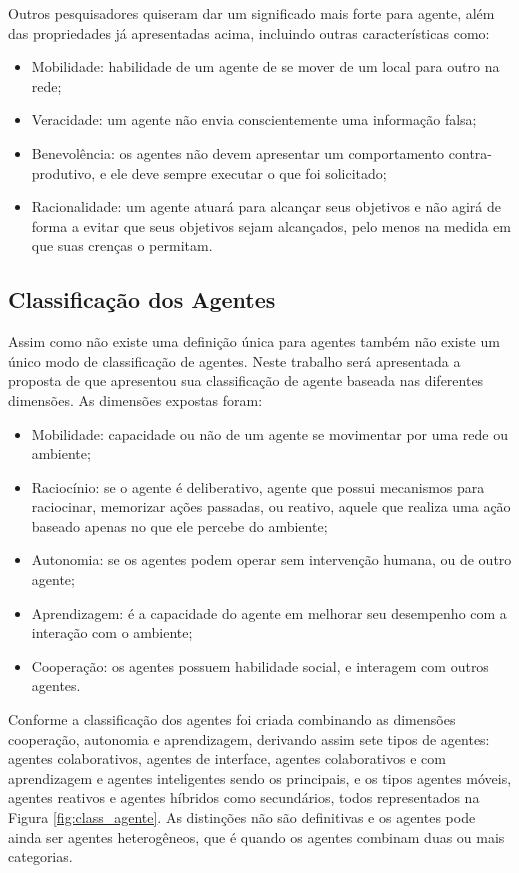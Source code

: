 Outros pesquisadores quiseram dar um significado mais forte para agente, além das propriedades já apresentadas acima, incluindo outras características como:

\begin{itemize}
\item Mobilidade: habilidade de um agente de se mover de um local para outro na rede;
\item Veracidade: um agente não envia conscientemente uma informação falsa;
\item Benevolência: os agentes não devem apresentar um comportamento contra-produtivo, e ele deve sempre executar o que foi solicitado;
\item Racionalidade: um agente atuará para alcançar seus objetivos e não agirá de forma a evitar que seus objetivos sejam alcançados, pelo menos na medida em que suas crenças o permitam.
\end{itemize}

\subsection{Classificação dos Agentes}

Assim como não existe uma definição única para agentes também não existe um único modo de classificação de agentes. Neste trabalho será apresentada a proposta de \citet{nwana1996software} que apresentou sua classificação de agente baseada nas diferentes dimensões. As dimensões expostas foram:

\begin{itemize}
\item Mobilidade: capacidade ou não de um agente se movimentar por uma rede ou ambiente;
\item Raciocínio: se o agente é deliberativo, agente que possui mecanismos para raciocinar, memorizar ações passadas, ou reativo, aquele que realiza uma ação baseado apenas no que ele percebe do ambiente;
\item Autonomia: se os agentes podem operar sem intervenção humana, ou de outro agente;
\item Aprendizagem: é a capacidade do agente em melhorar seu desempenho com a interação com o ambiente;
\item Cooperação: os agentes possuem habilidade social, e interagem com outros agentes.
\end{itemize}

 Conforme \cite{nwana1996software} a classificação dos agentes foi criada  combinando as dimensões cooperação, autonomia e aprendizagem, derivando assim sete tipos de agentes: agentes colaborativos, agentes de interface, agentes colaborativos e com aprendizagem e agentes inteligentes sendo os principais, e os tipos  agentes móveis, agentes reativos e agentes híbridos como secundários, todos representados na Figura \ref{fig:class_agente}. As distinções não são definitivas e os agentes pode ainda ser agentes heterogêneos, que é quando os agentes combinam duas ou mais categorias.



